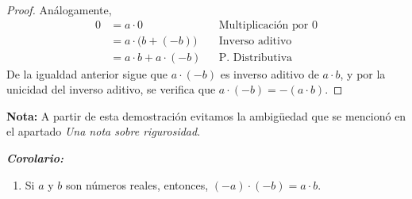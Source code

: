 \documentclass[11pt]{article}
\newcommand{\bfit}[1]{\textbf{\textit{#1}}}
\begin{document}
\begin{enumerate}[label=\alph*)]
\begin{proof}
        Análogamente,
        \begin{align*}
            0 &= a\cdot 0 && \text{Multiplicación por $0$}\\
            &= a \cdot \bigl(b+(-b)\bigr) && \text{Inverso aditivo}\\
            &= a\cdot b + a\cdot (-b) && \text{P. Distributiva}
        \end{align*} De la igualdad anterior sigue que $a\cdot (-b)$ es inverso aditivo de $a\cdot b$, y por la unicidad del inverso aditivo, se verifica que $a\cdot (-b) = -(a\cdot b)$.   
    \end{proof} \vspace{-1em}
    \textbf{Nota:} A partir de esta demostración evitamos la ambigüedad que se mencionó en el apartado \textit{Una nota sobre rigurosidad}.

    \bfit{Corolario:}
    \begin{enumerate}[label=\roman*)]
        \item Si $a$ y $b$ son números reales, entonces, $ (-a) \cdot (-b) = a \cdot b $.%
    

\end{enumerate}
\end{enumerate}
\end{document}
